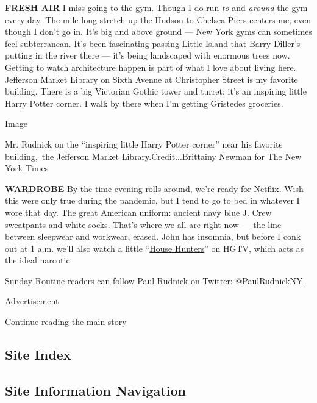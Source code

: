 \textbf{FRESH AIR} I miss going to the gym. Though I do run \emph{to}
and \emph{around} the gym every day. The mile-long stretch up the Hudson
to Chelsea Piers centers me, even though I don't go in. It's big and
above ground --- New York gyms can sometimes feel subterranean. It's
been fascinating passing \href{https://littleisland.org/}{Little Island}
that Barry Diller's putting in the river there --- it's being landscaped
with enormous trees now. Getting to watch architecture happen is part of
what I love about living here.
\href{https://timesmachine.nytimes3xbfgragh.onion/timesmachine/1967/05/07/83598670.html?pageNumber=386}{Jefferson
Market Library} on Sixth Avenue at Christopher Street is my favorite
building. There is a big Victorian Gothic tower and turret; it's an
inspiring little Harry Potter corner. I walk by there when I'm getting
Gristedes groceries.

Image

Mr. Rudnick on the ``inspiring little Harry Potter corner'' near his
favorite building,~the Jefferson Market Library.Credit...Brittainy
Newman for The New York Times

\textbf{WARDROBE} By the time evening rolls around, we're ready for
Netflix. Wish this were only true during the pandemic, but I tend to go
to bed in whatever I wore that day. The great American uniform: ancient
navy blue J. Crew sweatpants and white socks. That's where we all are
right now --- the line between sleepwear and workwear, erased. John has
insomnia, but before I conk out at 1 a.m. we'll also watch a little
``\href{https://www.hgtv.com/shows/house-hunters}{House Hunters}'' on
HGTV, which acts as the ideal narcotic.

Sunday Routine readers can follow Paul Rudnick on Twitter:
@PaulRudnickNY.

Advertisement

\protect\hyperlink{after-bottom}{Continue reading the main story}

\hypertarget{site-index}{%
\subsection{Site Index}\label{site-index}}

\hypertarget{site-information-navigation}{%
\subsection{Site Information
Navigation}\label{site-information-navigation}}

